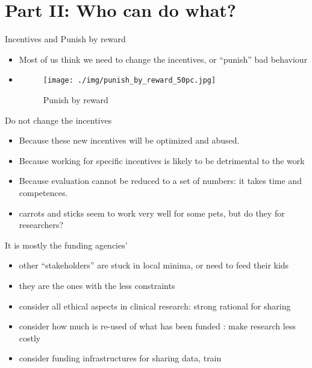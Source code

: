 \documentclass[ignorenonframetext,]{beamer}
\begin{document}
\section{Part II: Who can do what?}\label{part-ii-who-can-do-what}

\begin{frame}{Incentives and Punish by reward}

\begin{itemize}[<+->]
\item
  Most of us think we need to change the incentives, or ``punish'' bad
  behaviour
\item
  \begin{figure}[htbp]
  \centering
  \texttt{[image: ./img/punish\_by\_reward\_50pc.jpg]}
  \caption{Punish by reward}
  \end{figure}
\end{itemize}

\end{frame}

\begin{frame}{Do not change the incentives}

\begin{itemize}[<+->]
\itemsep1pt\parskip0pt
\item
  Because these new incentives will be optimized and abused.
\item
  Because working for specific incentives is likely to be detrimental to
  the work
\item
  Because evaluation cannot be reduced to a set of numbers: it takes
  time and competences.
\item
  carrots and sticks seem to work very well for some pets, but do they
  for researchers?
\end{itemize}

\end{frame}

\begin{frame}{It is mostly the funding agencies'}

\begin{itemize}[<+->]
\itemsep1pt\parskip0pt
\item
  other ``stakeholders'' are stuck in local minima, or need to feed
  their kids
\item
  they are the ones with the less constraints
\item
  consider all ethical aspects in clinical research: strong rational for
  sharing
\item
  consider how much is re-used of what has been funded : make research
  less costly
\item
  consider funding infrastructures for sharing data, train
\end{itemize}

\end{frame}
\end{document}
